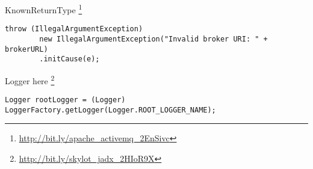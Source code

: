 \begin{pattern}{KnownReturnType}
\footnote{\url{http://bit.ly/apache_activemq_2EnSivc}}

\begin{verbatim}
throw (IllegalArgumentException)
        new IllegalArgumentException("Invalid broker URI: " + brokerURL)
        .initCause(e);
\end{verbatim}


Logger here
\footnote{\url{http://bit.ly/skylot_jadx_2HIoR9X}}

\begin{verbatim}
Logger rootLogger = (Logger) LoggerFactory.getLogger(Logger.ROOT_LOGGER_NAME);
\end{verbatim}



\detection{}

\discussion{}

\related{}

\end{pattern}